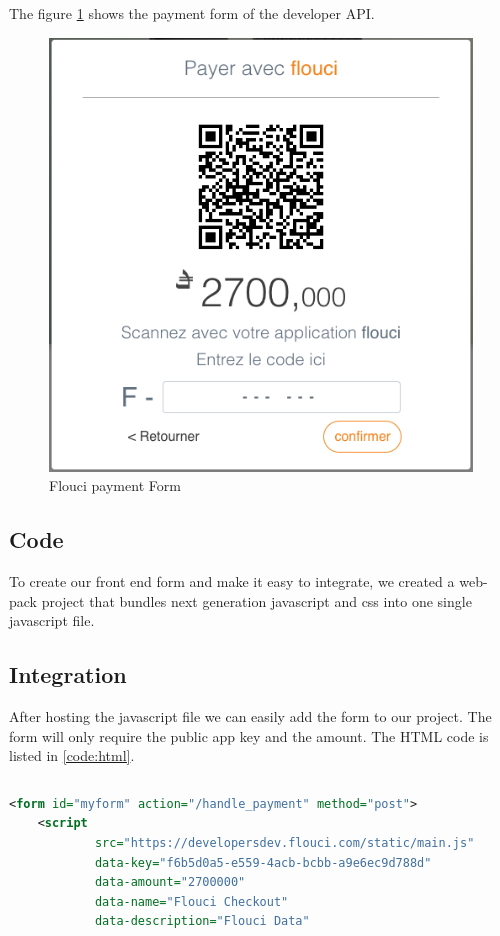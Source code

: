 \begin{spacing}{1.2}
The figure \ref{fig:onlinepay} shows the payment form of the developer API.
\begin{figure}[H]\centering
\includegraphics[scale=0.5]{payment_form.png}
\caption{Flouci payment Form}
\label{fig:onlinepay}
\end{figure}

\subsection{Code}
To create our front end form and make it easy to integrate, we created a web-pack project that bundles next generation javascript and css into one single javascript file.

\subsection{Integration}
After hosting the javascript file we can easily add the form to our project. The form will only require the public app key  and the amount.
The HTML code is listed in \ref{code:html}.
\begin{lstlisting}[rulecolor=\color{white}]
\end{lstlisting}
\begin{lstlisting}[label=code:html,caption=Flouci Integration Java,language=xml]
 <form id="myform" action="/handle_payment" method="post">
    <script
            src="https://developersdev.flouci.com/static/main.js"
            data-key="f6b5d0a5-e559-4acb-bcbb-a9e6ec9d788d"
            data-amount="2700000"
            data-name="Flouci Checkout"
            data-description="Flouci Data"


\end{lstlisting}
\end{spacing}
